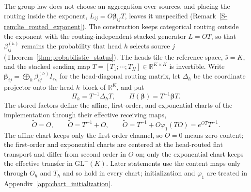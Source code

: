 \documentclass[twoside,11pt]{article}
\begin{document}
The group law does not choose an aggregation over sources, and placing the routing inside the exponent, $L_{ij}=O\boldsymbol\beta_{ij}T$, leaves it unspecified (Remark~\ref{S-rem:lie_routed_exponent}). The construction keeps categorical routing outside the exponent with the routing-independent stacked generator $L=OT$, so that $\beta_{ij}^{(h)}$ remains the probability that head $h$ selects source $j$ (Theorem~\ref{thm:probabilistic_status}). The heads tile the reference space, $\bar s=K$, and the stacked sending map $T=[T_1;\cdots;T_H]\in\mathbb R^{K\times K}$ is invertible. Write $\boldsymbol\beta_{ij}=\bigoplus_h\beta_{ij}^{(h)}I_{s_h}$ for the head-diagonal routing matrix, let $\Delta_h$ be the coordinate projector onto the head-$h$ block of $\mathbb R^{K}$, and put
\begin{equation}
\Pi_h=T^{-1}\Delta_hT,\qquad
\Pi(\boldsymbol\beta)=T^{-1}\boldsymbol\beta T.
\label{eq:routed_projectors}
\end{equation}
The stored factors define the affine, first-order, and exponential charts of the implementation through their effective receiving maps,
\begin{equation}
\widetilde O=O,\qquad
\widetilde O=T^{-1}+O,\qquad
\widetilde O=T^{-1}+O\varphi_1(TO)=e^{OT}T^{-1}.
\label{eq:lie_three_charts}
\end{equation}
The affine chart keeps only the first-order channel, so $O=0$ means zero content; the first-order and exponential charts are centered at the head-routed flat transport and differ from second order in $O$ on; only the exponential chart keeps the effective transfer in $\mathrm{GL}^+(K)$. Later statements use the content maps only through $\widetilde O_h$ and $T_h$ and so hold in every chart; initialization and $\varphi_1$ are treated in Appendix~\ref{app:chart_initialization}.
\end{document}
